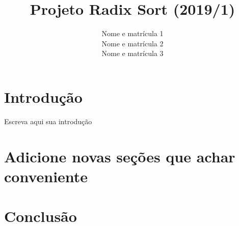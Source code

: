 \documentclass[a4paper, 10pt]{article}
\title{\LARGE \bf
Projeto Radix Sort (2019/1)
}
\author{Nome e matrícula 1\\ Nome e matrícula 2 \\ Nome e matrícula 3}
\begin{document}
\maketitle

\section{Introdução}

Escreva aqui sua introdução

\section{Adicione novas seções que achar conveniente}

\section{Conclusão}
\end{document}
